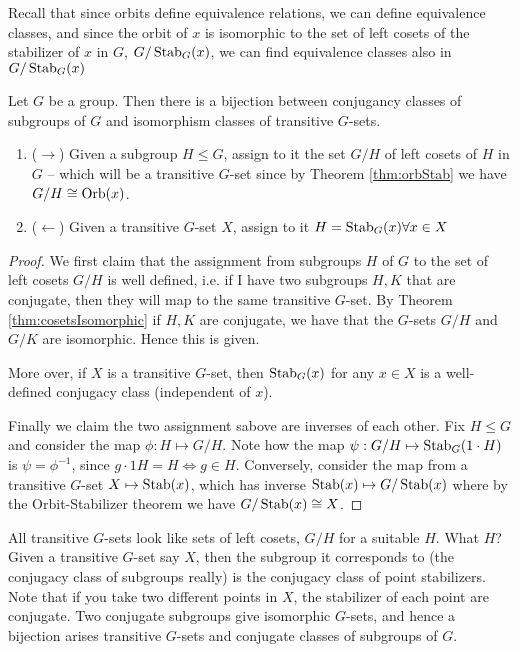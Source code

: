 Recall that since orbits define equivalence relations, we can define equivalence classes,
and since the orbit of $x$ is isomorphic to the set of left cosets of the stabilizer of
$x$ in $G$, $G/\operatorname*{Stab}_G(x)$, we can find equivalence classes also in $G/\operatorname*{Stab}_G(x)$
\begin{theorem}
  Let $G$ be a group. Then there is a bijection between conjugancy classes of subgroups of
  $G$ and isomorphism classes of transitive $G$-sets.
  \begin{enumerate}
    \item ($\rightarrow$) Given a subgroup $H\leq G$, assign to it the set $G/H$ of left
      cosets of $H$ in $G$ -- which will be a transitive $G$-set since by Theorem \ref{thm:orbStab} we
      have $G/H\cong \operatorname*{Orb}(x)$.
    \item ($\leftarrow$) Given a transitive $G$-set $X$, assign to it $H=\operatorname*{Stab}_G(x)\forall
      x\in X$
  \end{enumerate}
  \label{<+label+>}
\end{theorem}
\begin{proof}
  We first claim that the assignment from subgroups $H$ of $G$ to the set of left cosets
  $G/H$ is well defined, i.e. if I have two subgroups $H,K$ that are conjugate, then they
  will map to the same transitive $G$-set. By Theorem \ref{thm:cosetsIsomorphic} if $H,K$
  are conjugate, we have that the $G$-sets $G/H$ and $G/K$ are isomorphic. Hence this is
  given.

  More over, if $X$ is a transitive $G$-set, then $\operatorname*{Stab}_G(x)$ for any $x\in X$ is a
  well-defined conjugacy class (independent of $x$).
   
  Finally we claim the two assignment sabove are inverses of each other. Fix $H\leq
  G$ and consider the map $\phi:H\mapsto G/H$. Note how the map
  $\psi:G/H\mapsto\operatorname*{Stab}_G(1\cdot H)$ is $\psi=\phi^{-1}$, since $g\cdot 1H=H \iff g\in H$.
  Conversely, consider the map from a transitive $G$-set $X\mapsto \operatorname*{Stab}(x)$, which has
  inverse $\operatorname*{Stab}(x)\mapsto G/\operatorname*{Stab}(x)$ where by the Orbit-Stabilizer theorem we have
  $G/\operatorname*{Stab}(x)\cong X$.
  
\end{proof}

All transitive $G$-sets look like sets of left cosets, $G/H$ for a suitable $H$. What $H$?
Given a transitive $G$-set say $X$, then the subgroup it corresponds to (the conjugacy
class of subgroups really) is the conjugacy class of point stabilizers.
Note that if you take two different points in $X$, the stabilizer of each point are
conjugate. Two conjugate subgroups give isomorphic $G$-sets, and hence a bijection arises
transitive $G$-sets and conjugate classes of subgroups of $G$.
